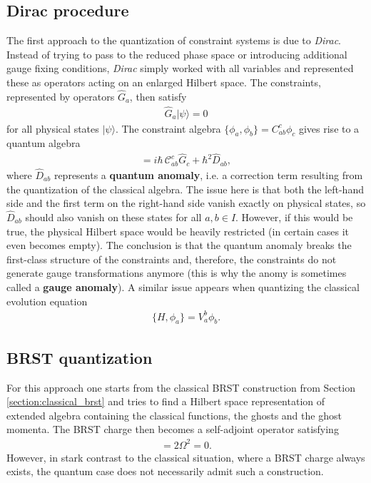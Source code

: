 \subsection{Dirac procedure}

    The first approach to the quantization of constraint systems is due to \textit{Dirac}. Instead of trying to pass to the reduced phase space or introducing additional gauge fixing conditions, \textit{Dirac} simply worked with all variables and represented these as operators acting on an enlarged Hilbert space. The constraints, represented by operators $\hat{G}_a$, then satisfy
    \begin{gather}
        \hat{G}_a|\psi\rangle=0
    \end{gather}
    for all physical states $|\psi\rangle$. The constraint algebra $\{\phi_a,\phi_b\} = C^c_{ab}\phi_c$ gives rise to a quantum algebra
    \begin{gather}
        [\hat{G}_a,\hat{G}_b] = i\hbar\,\mathcal{C}^c_{ab}\hat{G}_c + \hbar^2\hat{D}_{ab},
    \end{gather}
    where $\hat{D}_{ab}$ represents a \textbf{quantum anomaly}, i.e. a correction term resulting from the quantization of the classical algebra. The issue here is that both the left-hand side and the first term on the right-hand side vanish exactly on physical states, so $\hat{D}_{ab}$ should also vanish on these states for all $a,b\in I$. However, if this would be true, the physical Hilbert space would be heavily restricted (in certain cases it even becomes empty). The conclusion is that the quantum anomaly breaks the first-class structure of the constraints and, therefore, the constraints do not generate gauge transformations anymore (this is why the anomy is sometimes called a \textbf{gauge anomaly}). A similar issue appears when quantizing the classical evolution equation
    \begin{gather}
        \{H,\phi_a\} = V_a^b\phi_b.
    \end{gather}

\subsection{BRST quantization}

    For this approach one starts from the classical BRST construction from Section \ref{section:classical_brst} and tries to find a Hilbert space representation of extended algebra containing the classical functions, the ghosts and the ghost momenta. The BRST charge then becomes a self-adjoint operator satisfying
    \begin{gather}
        [\Omega,\Omega] = 2\Omega^2 = 0.
    \end{gather}
    However, in stark contrast to the classical situation, where a BRST charge always exists, the quantum case does not necessarily admit such a construction.

